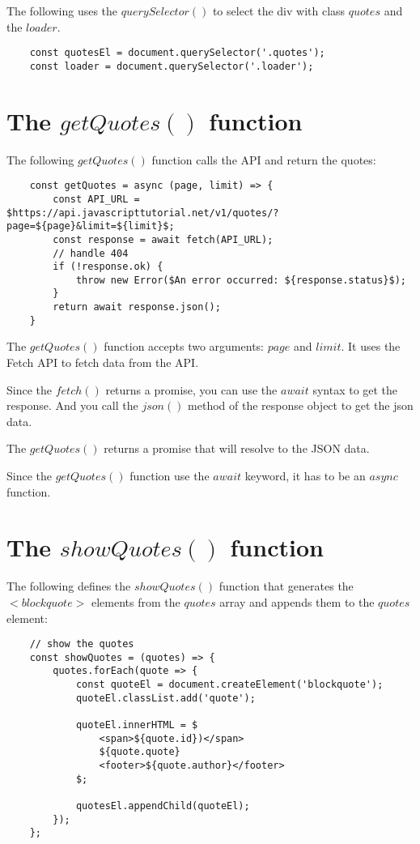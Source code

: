 \documentclass[11pt]{article}
\begin{document}
The following uses the $querySelector()$ to select the div with
class $quotes$ and the $loader$.

\begin{lstlisting}
    const quotesEl = document.querySelector('.quotes');
    const loader = document.querySelector('.loader');
\end{lstlisting}

\section*{The $getQuotes()$ function}

The following $getQuotes()$ function calls the API and return the quotes:

\begin{lstlisting}
    const getQuotes = async (page, limit) => {
        const API_URL = $https://api.javascripttutorial.net/v1/quotes/?page=${page}&limit=${limit}$;
        const response = await fetch(API_URL);
        // handle 404
        if (!response.ok) {
            throw new Error($An error occurred: ${response.status}$);
        }
        return await response.json();
    }
\end{lstlisting}

The $getQuotes()$ function accepts two arguments: $page$ and $limit$.
It uses the Fetch API to fetch data from the API.

Since the $fetch()$ returns a promise, you can use the $await$ syntax
to get the response. And you call the $json()$ method of the response
object to get the json data.

The $getQuotes()$ returns a promise that will resolve to the JSON data.

Since the $getQuotes()$ function use the $await$ keyword, it has to be
an $async$ function.

\section*{The $showQuotes()$ function}

The following defines the $showQuotes()$ function that generates
the $<blockquote>$ elements from the $quotes$ array and appends them
to the $quotes$ element:

\begin{lstlisting}
    // show the quotes
    const showQuotes = (quotes) => {
        quotes.forEach(quote => {
            const quoteEl = document.createElement('blockquote');
            quoteEl.classList.add('quote');

            quoteEl.innerHTML = $
                <span>${quote.id})</span>
                ${quote.quote}
                <footer>${quote.author}</footer>
            $;

            quotesEl.appendChild(quoteEl);
        });
    };
\end{lstlisting}
\end{document}
